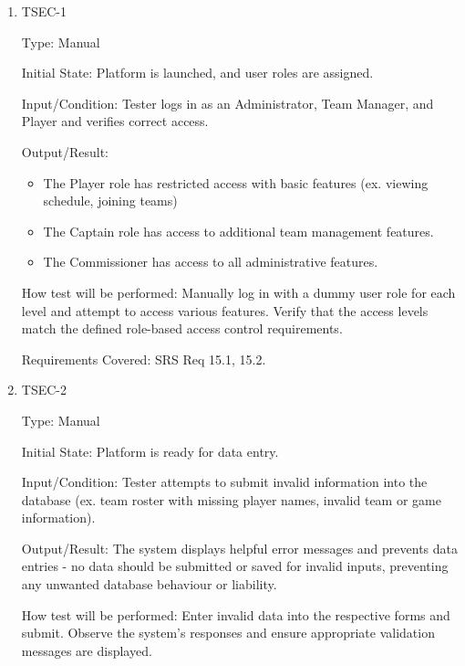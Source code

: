 \documentclass[12pt, titlepage]{article}
\begin{document}
\begin{enumerate}

    \item{TSEC-1\\}

          Type: Manual

          Initial State: Platform is launched, and user roles are assigned.

          Input/Condition: Tester logs in as an Administrator, Team Manager, and Player and verifies correct access.

          Output/Result:

          \begin{itemize}
              \item{The Player role has restricted access with basic features (ex. viewing schedule, joining teams)}
              \item{The Captain role has access to additional team management features.}
              \item{The Commissioner has access to all administrative features.}

          \end{itemize}

          How test will be performed: Manually log in with a dummy user role for each level and attempt to access various features. Verify that the access levels match the defined role-based access control requirements.

          Requirements Covered: SRS Req 15.1, 15.2.

    \item{TSEC-2\\}

          Type: Manual

          Initial State: Platform is ready for data entry.

          Input/Condition: Tester attempts to submit invalid information into the database (ex. team roster with missing player names, invalid team or game information).

          Output/Result: The system displays helpful error messages and prevents data entries - no data should be submitted or saved for invalid inputs, preventing any unwanted database behaviour or liability.

          How test will be performed: Enter invalid data into the respective forms and submit. Observe the system's responses and ensure appropriate validation messages are displayed.


\end{enumerate}
\end{document}
